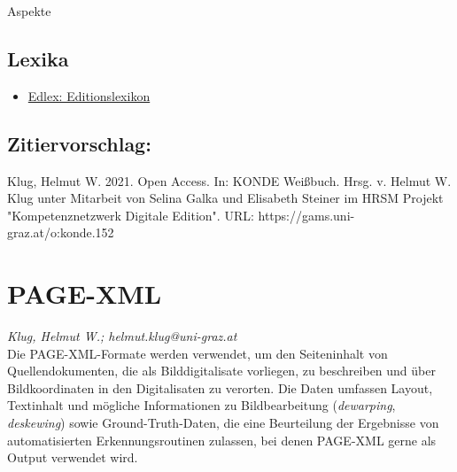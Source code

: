 \documentclass{article}
\begin{document}
Aspekte\subsection*{Lexika}\begin{itemize}\item \href{https://edlex.de/index.php?title=Open_Access}{Edlex: Editionslexikon}\end{itemize}\subsection*{Zitiervorschlag:}Klug, Helmut W. 2021. Open Access. In: KONDE Weißbuch. Hrsg. v. Helmut W. Klug unter Mitarbeit von Selina Galka und Elisabeth Steiner im HRSM Projekt "Kompetenznetzwerk Digitale Edition". URL: https://gams.uni-graz.at/o:konde.152\newpage\section*{PAGE-XML} \emph{Klug, Helmut W.; helmut.klug@uni-graz.at }\\
        
    Die PAGE-XML-Formate werden verwendet, um den Seiteninhalt von Quellendokumenten, die als Bilddigitalisate vorliegen, zu beschreiben und über Bildkoordinaten in den Digitalisaten zu verorten. Die Daten umfassen Layout, Textinhalt und mögliche Informationen zu Bildbearbeitung (\emph{dewarping}, \emph{deskewing}) sowie Ground-Truth-Daten, die eine Beurteilung der Ergebnisse von automatisierten Erkennungsroutinen zulassen, bei denen PAGE-XML gerne als Output verwendet wird. \\
            
\end{document}
